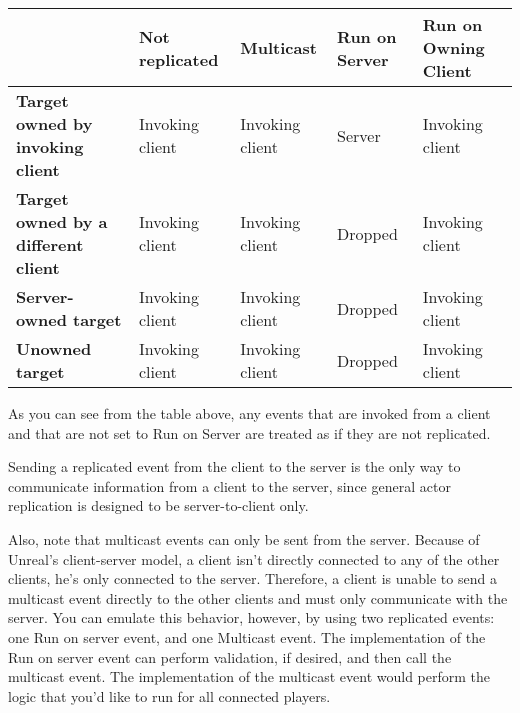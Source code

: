 \documentclass[
  letterpaper,
  DIV=11,
  numbers=noendperiod]{scrartcl}
\begin{document}
\begin{longtable}[]{@{}
  >{\raggedright\arraybackslash}p{}
  >{\raggedright\arraybackslash}p{}
  >{\raggedright\arraybackslash}p{}
  >{\raggedright\arraybackslash}p{}
  >{\raggedright\arraybackslash}p{}@{}}
\toprule\noalign{}
\begin{minipage}[b]{\linewidth}\raggedright
\end{minipage} & \begin{minipage}[b]{\linewidth}\raggedright
Not replicated
\end{minipage} & \begin{minipage}[b]{\linewidth}\raggedright
Multicast
\end{minipage} & \begin{minipage}[b]{\linewidth}\raggedright
Run on Server
\end{minipage} & \begin{minipage}[b]{\linewidth}\raggedright
Run on Owning Client
\end{minipage} \\
\midrule\noalign{}
\endhead
\bottomrule\noalign{}
\endlastfoot
\textbf{Target owned by invoking client} & Invoking client & Invoking
client & Server & Invoking client \\
\textbf{Target owned by a different client} & Invoking client & Invoking
client & Dropped & Invoking client \\
\textbf{Server-owned target} & Invoking client & Invoking client &
Dropped & Invoking client \\
\textbf{Unowned target} & Invoking client & Invoking client & Dropped &
Invoking client \\
\end{longtable}

As you can see from the table above, any events that are invoked from a
client and that are not set to Run on Server are treated as if they are
not replicated.

Sending a replicated event from the client to the server is the only way
to communicate information from a client to the server, since general
actor replication is designed to be server-to-client only.

Also, note that multicast events can only be sent from the server.
Because of Unreal's client-server model, a client isn't directly
connected to any of the other clients, he's only connected to the
server. Therefore, a client is unable to send a multicast event directly
to the other clients and must only communicate with the server. You can
emulate this behavior, however, by using two replicated events: one Run
on server event, and one Multicast event. The implementation of the Run
on server event can perform validation, if desired, and then call the
multicast event. The implementation of the multicast event would perform
the logic that you'd like to run for all connected players.
\end{document}
